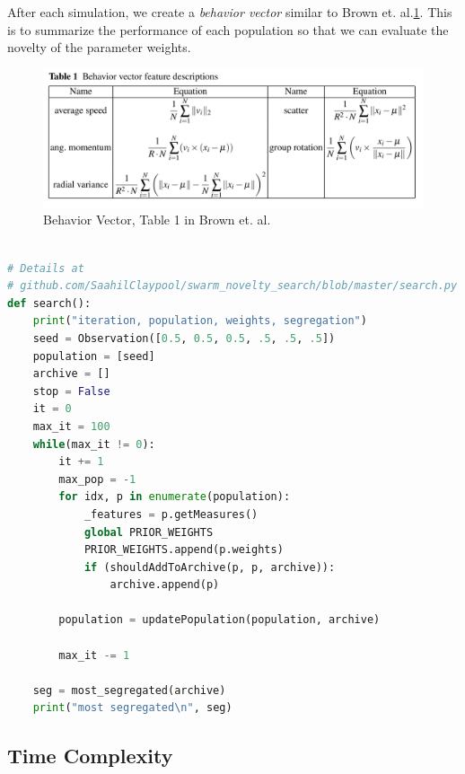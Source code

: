 After each simulation, we create a \emph{behavior vector} similar to Brown et. al.\ref{fig:vec}.
This is to summarize the performance of each population so that we can evaluate the novelty of the parameter weights. 

\begin{figure}
    \centering
    \includegraphics[width=\linewidth]{imgs/measures.png}
    \caption{Behavior Vector, Table 1 in Brown et. al.\cite{c1}}
    \label{fig:vec}
\end{figure}

\begin{lstlisting}[caption={Search algorithm (Python)}, label={lst:search}, language=Python, breaklines=true]

# Details at 
# github.com/SaahilClaypool/swarm_novelty_search/blob/master/search.py
def search():
    print("iteration, population, weights, segregation")
    seed = Observation([0.5, 0.5, 0.5, .5, .5, .5])
    population = [seed]
    archive = []
    stop = False
    it = 0
    max_it = 100
    while(max_it != 0):
        it += 1
        max_pop = -1
        for idx, p in enumerate(population):
            _features = p.getMeasures()
            global PRIOR_WEIGHTS
            PRIOR_WEIGHTS.append(p.weights)
            if (shouldAddToArchive(p, p, archive)):
                archive.append(p)

        population = updatePopulation(population, archive)

        max_it -= 1

    seg = most_segregated(archive)
    print("most segregated\n", seg)

\end{lstlisting}

\subsection{Time Complexity}
\label{sec:time}

